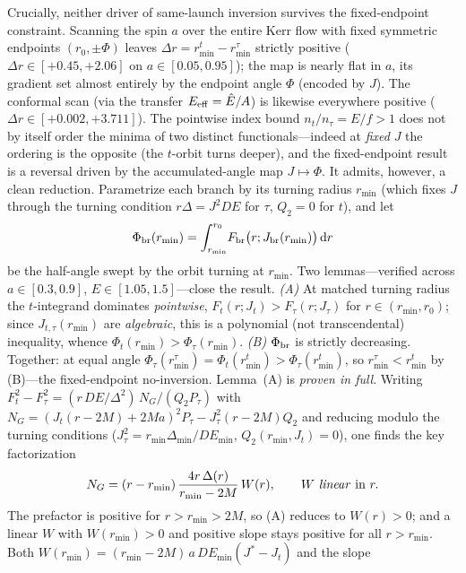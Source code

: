 \documentclass[12pt]{iopart}
\newcommand{\dd}{\mathrm{d}}
\begin{document}
Crucially, neither driver of same-launch inversion survives the
fixed-endpoint constraint. Scanning the spin $a$ over the entire
Kerr flow with fixed symmetric endpoints $(r_0,\pm\Phi)$ leaves
$\Delta r=r_{\min}^t-r_{\min}^\tau$ strictly positive
($\Delta r\in[+0.45,+2.06]$ on $a\in[0.05,0.95]$); the map is nearly flat
in $a$, its gradient set almost entirely by the endpoint angle
$\Phi$ (encoded by $J$). The conformal scan (via the transfer
$E_{\rm eff}=\hat E/A$) is likewise everywhere positive
($\Delta r\in[+0.002,+3.711]$). The pointwise index bound $n_t/n_\tau=E/f>1$ does
not by itself order the minima of two distinct functionals---indeed at \emph{fixed}
$J$ the ordering is the opposite (the $t$-orbit turns deeper), and the fixed-endpoint
result is a reversal driven by the accumulated-angle map $J\mapsto\Phi$. It admits,
however, a clean reduction. Parametrize each branch by its turning radius $r_{\min}$
(which fixes $J$ through the turning condition $r\Delta=J^2 DE$ for $\tau$, $Q_2=0$
for $t$), and let
\begin{equation}
    \Phi_{\rm br}(r_{\min})=\int_{r_{\min}}^{r_0}\!F_{\rm br}\big(r;J_{\rm br}(r_{\min})\big)\,\dd r
\end{equation}
be the half-angle swept by the orbit turning at $r_{\min}$. Two lemmas---verified
across $a\in[0.3,0.9]$, $E\in[1.05,1.5]$---close the result. \emph{(A)} At matched
turning radius the $t$-integrand dominates \emph{pointwise},
$F_t(r;J_t)>F_\tau(r;J_\tau)$ for $r\in(r_{\min},r_0)$; since $J_{t,\tau}(r_{\min})$
are \emph{algebraic}, this is a polynomial (not transcendental) inequality, whence
$\Phi_t(r_{\min})>\Phi_\tau(r_{\min})$. \emph{(B)} $\Phi_{\rm br}$ is strictly
decreasing. Together: at equal angle
$\Phi_\tau(r_{\min}^\tau)=\Phi_t(r_{\min}^t)>\Phi_\tau(r_{\min}^t)$, so
$r_{\min}^\tau<r_{\min}^t$ by (B)---the fixed-endpoint no-inversion. Lemma~(A) is
\emph{proven in full}. Writing $F_t^2-F_\tau^2=(r\,DE/\Delta^2)\,N_G/(Q_2 P_\tau)$
with $N_G=(J_t(r-2M)+2Ma)^2 P_\tau-J_\tau^2(r-2M)Q_2$ and reducing modulo the turning
conditions ($J_\tau^2=r_{\min}\Delta_{\min}/DE_{\min}$, $Q_2(r_{\min},J_t)=0$), one
finds the key factorization
\begin{equation}
    N_G=(r-r_{\min})\,\frac{4r\,\Delta(r)}{r_{\min}-2M}\,W(r),\qquad W\ \text{\emph{linear} in }r .
\end{equation}
The prefactor is positive for $r>r_{\min}>2M$, so (A) reduces to $W(r)>0$; and a
linear $W$ with $W(r_{\min})>0$ and positive slope stays positive for all
$r>r_{\min}$. Both $W(r_{\min})=(r_{\min}-2M)\,a\,DE_{\min}(J^\ast-J_t)$ and the slope
\end{document}
